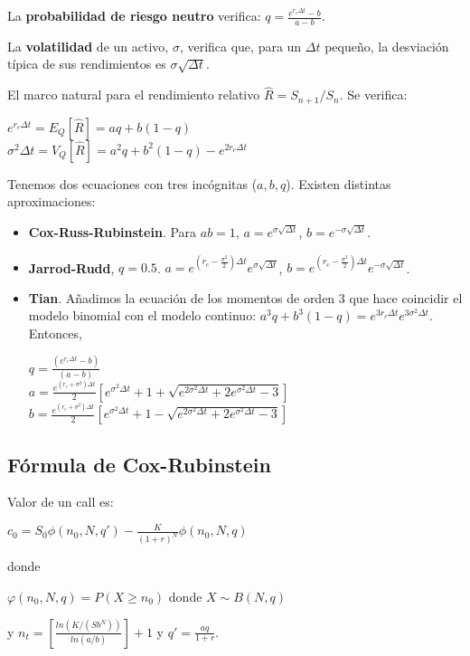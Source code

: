 \documentclass[
10pt, %
a4paper, %
oneside, %
headinclude,footinclude, %
BCOR5mm, %
]{scrartcl}
\newcommand{\n}[1]{\textbf{#1}}
\newcommand{\sub}[1]{_{#1}}
\newcommand{\pot}[1]{^{#1}}
\newcommand{\f}[1]{{\large{${#1}$}}}
\newcounter{ex}
\begin{document}
			La \n{probabilidad de riesgo neutro} verifica: \f{q = \frac{e\pot{r\sub{c}\Delta t} - b}{a-b}}.

			La \n{volatilidad} de un activo, \f{\sigma}, verifica que, para un \f{\Delta t} pequeño, la desviación típica de sus rendimientos es \f{\sigma\sqrt{\Delta t}}.

			El marco natural para el rendimiento relativo \f{\hat{R} = S\sub{n+1}/S\sub{n}}. Se verifica: 
				\begin{center} \f{e\pot{r\sub{c}\Delta t} = E\sub{Q}[\hat{R}] = aq + b(1-q)} \\ \f{\sigma\pot{2} \Delta t = V\sub{Q}[\hat{R}] = a\pot{2}q + b\pot{2}(1-q) - e\pot{2r\sub{c}\Delta t}} \end{center}

			Tenemos dos ecuaciones con tres incógnitas (\f{a,b,q}). Existen distintas aproximaciones:
			\begin{itemize}
				\item \n{Cox-Russ-Rubinstein}. Para \f{ab = 1}, \f{a = e\pot{\sigma\sqrt{\Delta t}}}, \f{b = e\pot{-\sigma \sqrt{\Delta t}}}.
				\item \n{Jarrod-Rudd}, \f{q = 0.5}. \f{a = e\pot{(r\sub{c}-\frac{\sigma\pot{2}}{2}) \Delta t} e\pot{\sigma \sqrt{\Delta t}}}, \f{b = e\pot{(r\sub{c}-\frac{\sigma\pot{2}}{2}) \Delta t} e\pot{-\sigma \sqrt{\Delta t}}}.
				\item \n{Tian}. Añadimos la ecuación de los momentos de orden \f{3} que hace coincidir el modelo binomial con el modelo continuo: \f{a\pot{3}q + b\pot{3}(1-q) = e\pot{3r\sub{c}\Delta t} e\pot{3\sigma\pot{2} \Delta t}}.
				Entonces, 
				\begin{center} \f{q = \frac{(e\pot{r\sub{c}\Delta t} - b)}{(a-b)}} \\ \f{a = \frac{e\pot{(r\sub{c}+\sigma\pot{2})\Delta t}}{2} [e\pot{\sigma\pot{2} \Delta t} + 1 + \sqrt{e\pot{2\sigma\pot{2}\Delta t} + 2 e\pot{\sigma\pot{2} \Delta t} - 3}]} \\
				\f{b = \frac{e\pot{(r\sub{c}+\sigma\pot{2})\Delta t}}{2} [e\pot{\sigma\pot{2} \Delta t} + 1 - \sqrt{e\pot{2\sigma\pot{2}\Delta t} + 2 e\pot{\sigma\pot{2} \Delta t} - 3}]} \end{center}
			\end{itemize}

		\subsection{Fórmula de Cox-Rubinstein}

				Valor de un call es: 
				\begin{center} \f{c\sub{0} = S\sub{0} \phi(n\sub{0},N,q') - \frac{K}{(1+r)\pot{N}}\phi(n\sub{0},N,q)} \end{center}

				donde \begin{center} \f{\varphi(n\sub{0},N,q) = P(X\geq n\sub{0})} donde \f{X \sim B(N,q)} \end{center}

				y \f{n\sub{t} = [\frac{ln(K/(Sb\pot{N}))}{ln(a/b)}] + 1} y \f{q' = \frac{aq}{1+r}}.


		
\printindex
\end{document}
